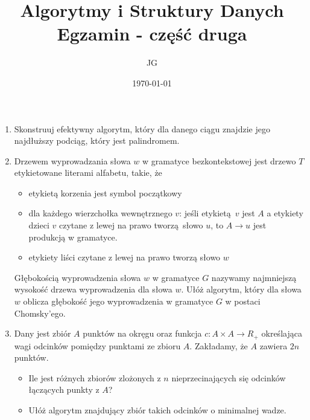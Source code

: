 \documentclass[12pt]{article}
\begin{document}
\begin{titlepage}

\title{\bfseries Algorytmy i Struktury Danych\\\Large Egzamin - część druga}
\date{\today}
\author{JG}
\end{titlepage}

\maketitle

\begin{enumerate}

    \item Skonstruuj efektywny algorytm, który dla danego ciągu
    znajdzie jego najdłuższy podciąg, który jest palindromem.

    \item Drzewem wyprowadzania słowa $w$ w gramatyce bezkontekstowej
    jest drzewo $T$ etykietowane literami alfabetu, takie, że
    \begin{itemize}
        \item etykietą korzenia jest symbol początkowy
        \item dla każdego wierzchołka wewnętrznego $v$: jeśli
        etykietą $v$ jest $A$ a etykiety dzieci $v$ czytane z lewej
        na prawo tworzą słowo $u$, to $A \rightarrow u$ jest produkcją
        w gramatyce.
        \item etykiety liści czytane z lewej na prawo tworzą słowo $w$
    \end{itemize}
    Głębokością wyprowadzenia słowa $w$ w gramatyce $G$ nazywamy najmniejszą
    wysokość drzewa wyprowadzenia dla słowa $w$. Ułóż algorytm, który dla słowa
    $w$ oblicza głębokość jego wyprowadzenia w gramatyce $G$ w postaci Chomsky'ego.

    \item Dany jest zbiór $A$ punktów na okręgu oraz funkcja 
    $c: A \times A \rightarrow R_+$ określająca wagi odcinków pomiędzy
    punktami ze zbioru $A$. Zakładamy, że $A$ zawiera $2n$ punktów.
    \begin{itemize}
        \item Ile jest różnych zbiorów zlożonych z $n$ nieprzecinających
        się odcinków łączących punkty z $A$?
        \item Ułóż algorytm znajdujący zbiór takich odcinków o minimalnej wadze.
    \end{itemize}
\end{enumerate}
\end{document}
